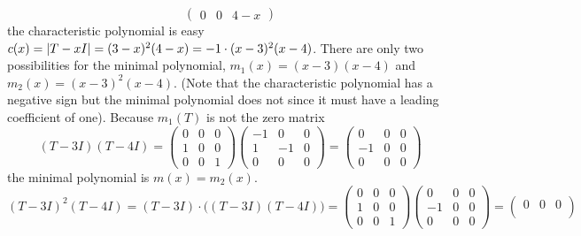 \begin{exercises}
\begin{answer}
\begin{exparts}
\begin{equation*}
\begin{pmatrix}
             0    &0    &4-x
           \end{pmatrix}
         \end{equation*}
         the characteristic polynomial is
         easy $c(x)=\deter{T-xI}=(3-x)^2(4-x)=-1\cdot (x-3)^2(x-4)$.
         There are only two possibilities for the minimal polynomial,
         $m_1(x)=(x-3)(x-4)$ and $m_2(x)=(x-3)^2(x-4)$.
         (Note that the characteristic polynomial has a negative sign
         but the minimal polynomial does not since it must
         have a leading coefficient of one).
         Because $m_1(T)$ is not the zero matrix
         \begin{equation*}
           (T-3I)(T-4I)
           =
           \begin{pmatrix}
             0  &0  &0  \\
             1  &0  &0  \\
             0  &0  &1
           \end{pmatrix}
           \begin{pmatrix}
             -1  &0  &0  \\
              1  &-1 &0  \\
              0  &0  &0
           \end{pmatrix}
           =
           \begin{pmatrix}
             0  &0  &0  \\
            -1  &0  &0  \\
             0  &0  &0
           \end{pmatrix}
         \end{equation*}
         the minimal polynomial is $m(x)=m_2(x)$.
         \begin{equation*}
           (T-3I)^2(T-4I)
           =(T-3I)\cdot\bigl((T-3I)(T-4I)\bigr)
           =
           \begin{pmatrix}
             0  &0  &0  \\
             1  &0  &0  \\
             0  &0  &1
           \end{pmatrix}
           \begin{pmatrix}
              0  &0  &0  \\
             -1  &0  &0  \\
              0  &0  &0
           \end{pmatrix}
           =
           \begin{pmatrix}
             0  &0  &0  \\

\end{pmatrix}
\end{equation*}
\end{exparts}
\end{answer}
\end{exercises}
